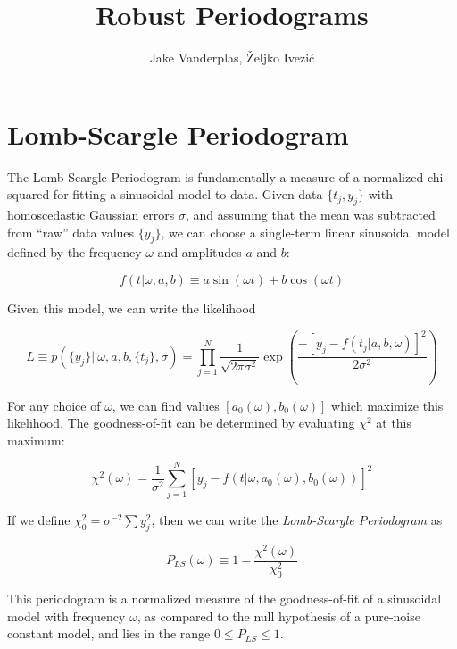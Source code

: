 \documentclass[12pt,pdftex]{article}
\title{Robust Periodograms}
\author{Jake Vanderplas, \v{Z}eljko Ivezi\'{c}}
\begin{document}
\maketitle

\section{Lomb-Scargle Periodogram}
The Lomb-Scargle Periodogram is fundamentally a measure of a normalized chi-squared for fitting a sinusoidal model to data. Given data $\{t_j, y_j\}$ with homoscedastic Gaussian errors $\sigma$, and assuming that the mean was subtracted from ``raw'' data
values $\{y_j\}$, we can choose a single-term linear sinusoidal model defined by the frequency $\omega$ and amplitudes $a$ and $b$:

\begin{equation}
  f(t|\omega, a, b) \equiv a\sin(\omega t) + b\cos(\omega t)
\end{equation}

Given this model, we can write the likelihood

\begin{equation}
\label{eq:dataL} 
 L \equiv p(\{y_j\} |~\omega, a, b, \{t_j\}, \sigma) =
  \prod_{j=1}^{N} \frac{1}{\sqrt{2\pi\sigma^2}} \exp\left(
  \frac{-[y_j - f(t_j|a, b, \omega)]^2}{2\sigma^2} \right)
\end{equation}

For any choice of $\omega$, we can find values $[a_0(\omega), b_0(\omega)]$ which maximize this likelihood. The goodness-of-fit can be determined by evaluating $\chi^2$ at this maximum:

\begin{equation}
  \chi^2(\omega) = \frac{1}{\sigma^2}\sum_{j=1}^N[y_j - f(t|\omega, a_0(\omega), b_0(\omega))]^2
\end{equation}

If we define $\chi_0^2 = \sigma^{-2}\sum y_j^2$, then we can write the {\it Lomb-Scargle Periodogram} as

\begin{equation}
\label{eq:PLS} 
  P_{LS}(\omega) \equiv 1 - \frac{\chi^2(\omega)}{\chi_0^2}
\end{equation}

This periodogram is a normalized measure of the goodness-of-fit of a sinusoidal model with frequency $\omega$, as compared to the null hypothesis of a pure-noise constant model, and lies in the range $0 \le P_{LS} \le 1$.
\end{document}
